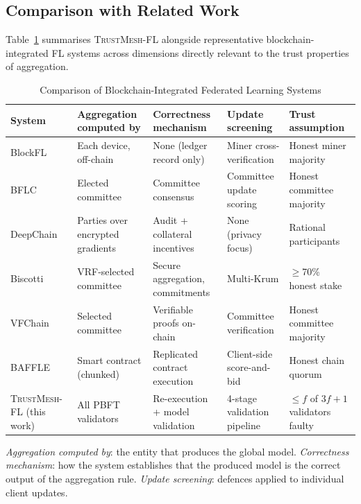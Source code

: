 \documentclass[lettersize,journal]{IEEEtran}
\newcommand{\tmfl}{\textsc{TrustMesh-FL}}
\begin{document}
\subsection{Comparison with Related Work}

Table~\ref{tab:related} summarises \tmfl{} alongside representative blockchain-integrated
FL systems across dimensions directly relevant to the trust properties of aggregation.

\begin{table}[t]
\centering
\caption{Comparison of Blockchain-Integrated Federated Learning Systems}
\label{tab:related}
\scriptsize
\setlength{\tabcolsep}{4pt}
\begin{tabular}{lllll}
\toprule
System & Aggregation computed by & Correctness mechanism & Update screening & Trust assumption \\
\midrule
BlockFL~\cite{kim2020blockchained}   & Each device, off-chain & None (ledger record only) & Miner cross-verification & Honest miner majority \\
BFLC~\cite{li2021bflc}               & Elected committee & Committee consensus & Committee update scoring & Honest committee majority \\
DeepChain~\cite{weng2021deepchain}   & Parties over encrypted gradients & Audit + collateral incentives & None (privacy focus) & Rational participants \\
Biscotti~\cite{shayan2021biscotti}   & VRF-selected committee & Secure aggregation, commitments & Multi-Krum & $\geq$70\% honest stake \\
VFChain~\cite{peng2022vfchain}       & Selected committee & Verifiable proofs on-chain & Committee verification & Honest committee majority \\
BAFFLE~\cite{ramanan2020baffle}      & Smart contract (chunked) & Replicated contract execution & Client-side score-and-bid & Honest chain quorum \\
\tmfl{} (this work)                  & All PBFT validators & Re-execution + model validation & 4-stage validation pipeline & $\leq f$ of $3f{+}1$ validators faulty \\
\bottomrule
\end{tabular}
\vspace{2pt}

{\footnotesize
\textit{Aggregation computed by}: the entity that produces the global model.
\textit{Correctness mechanism}: how the system establishes that the produced model is
the correct output of the aggregation rule.
\textit{Update screening}: defences applied to individual client updates.
}
\end{table}
\end{document}
